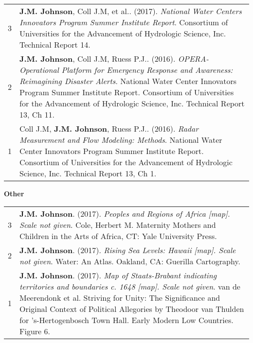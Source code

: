 \documentclass{article}
\newcommand{\header}[1]{\hspace{-5mm}\textcolor{header_blue}{\underline{\textbf{#1}}\\}} %
\newcommand{\subheader}[1]{\hspace{25mm}\textcolor{header_blue}{\textbf{#1}\\}} %
\newcommand{\me}{\textbf{J.M. Johnson}} %
\begin{document}
\begin{tabular}{rP{15.5cm}}
  3 & {\me}, Coll J.M, et al.. (2017). {\textit{National Water Centers Innovators Program Summer Institute Report}. Consortium of Universities for the Advancement of Hydrologic Science, Inc. Technical Report 14.  } \\ 
  2 & {\me}, Coll J.M, Ruess P.J.. (2016). {\textit{OPERA-Operational Platform for Emergency Response and Awareness: Reimagining Disaster Alerts}. National Water Center Innovators Program Summer Institute Report. Consortium of Universities for the Advancement of Hydrologic Science, Inc. Technical Report 13, Ch 11.  } \\ 
  1 & Coll J.M, {\me}, Ruess P.J.. (2016). {\textit{Radar Measurement and Flow Modeling: Methods}. National Water Center Innovators Program Summer Institute Report. Consortium of Universities for the Advancement of Hydrologic Science, Inc. Technical Report 13, Ch 1.  } \\ 
  \end{tabular}
\vspace{5mm}
\newline
\subheader{Other}

\begin{tabular}{rP{15.5cm}}
  3 & {\me}. (2017). {\textit{Peoples and Regions of Africa [map]. Scale not given}. Cole, Herbert M. Maternity Mothers and Children in the Arts of Africa, CT: Yale University Press.  } \\ 
  2 & {\me}. (2017). {\textit{Rising Sea Levels: Hawaii [map]. Scale not given}. Water: An Atlas. Oakland, CA: Guerilla Cartography.  } \\ 
  1 & {\me}. (2017). {\textit{Map of Staats-Brabant indicating territories and boundaries c. 1648 [map]. Scale not given}. van de Meerendonk et al. Striving for Unity: The Significance and Original Context of Political Allegories by Theodoor van Thulden for 's-Hertogenbosch Town Hall. Early Modern Low Countries. Figure 6.  } \\ 
  \end{tabular}\newline

\end{document}

